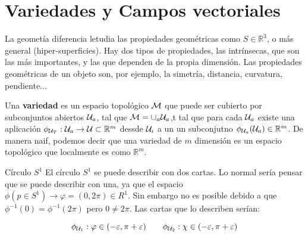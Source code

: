 \chapter{Variedades y Campos vectoriales}

La geometía diferencia letudia las propiedades geométricas como $S \in \mathbb{R}^3$, o más general (hiper-superficies). Hay dos tipos de propiedades, las intrínsecas, que son las más importantes, y las que dependen de la propia dimensión. Las propiedades geométricas de un objeto son, por ejemplo, la simetría, distancia, curvatura, pendiente... 

\begin{Definicion}
    Una \textbf{variedad} es un espacio topológico $\mathcal{M}$ que puede ser cubierto por subconjuntos abiertos $\mathcal{U}_a$, tal que $\mathcal{M}=\cup_{a} \mathcal{U}_a$,t tal que para cada $\mathcal{U}_a$ existe una aplicación $\phi_{\mathcal{U}_T}: \mathcal{U}_a \to \mathcal{U} \subset \mathbb{R}^m$ dessde $\mathcal{U}_i$ a un un subconjutno $\phi_{\mathcal{U}_a}(\mathcal{U}_a) \in \mathbb{R}^m$. De manera naif, podemos decir que una variedad de $m$ dimensión es un espacio topológico que localmente es como $\mathbb{R}^m$. 
\end{Definicion}

\begin{Ejemplo}{Círculo $S^1$}
    El círculo $S^1$ se puede describir con dos cartas. Lo normal sería pensar que se puede describir con una, ya que el espacio $\phi(p\in S^1) \to \varphi = (0,2\pi) \in R^1$. Sin embargo no es posible debido a que $\phi^{-1}(0) = \phi^{-1} (2\pi)$ pero $0 \neq 2 \pi$. Las cartas que lo describen serían: 

    \begin{equation}
    \phi_{\mathcal{U}_1}: \varphi \in (-\varepsilon,\pi + \varepsilon) \qquad  
    \phi_{\mathcal{U}_2}: \chi \in (-\varepsilon,\pi + \varepsilon) 
    \end{equation}
    
\end{Ejemplo}